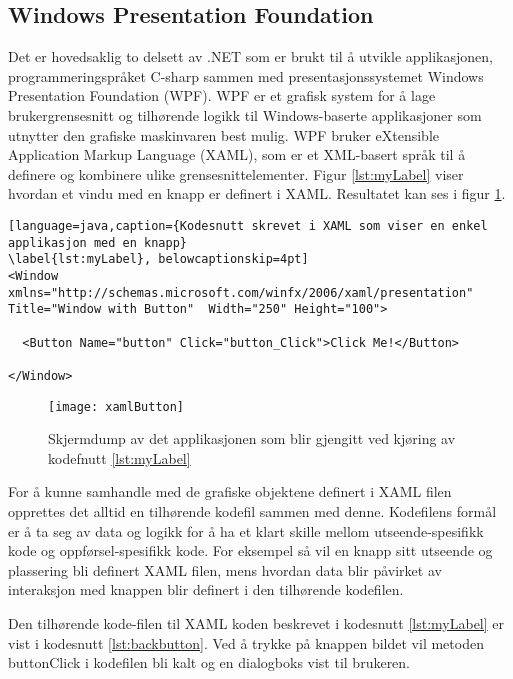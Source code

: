 \subsection{Windows Presentation Foundation}

Det er hovedsaklig to delsett av .NET som er brukt til å utvikle applikasjonen, programmeringspråket C-sharp sammen med presentasjonssystemet Windows Presentation Foundation (\gls{WPF}).  WPF er et grafisk system for å lage brukergrensesnitt og tilhørende logikk til Windows-baserte applikasjoner som utnytter den grafiske maskinvaren best mulig. WPF bruker eXtensible Application Markup Language (\gls{XAML}), som er et XML-basert språk til å definere og kombinere ulike grensesnittelementer. Figur \ref{lst:myLabel} viser hvordan et vindu med en knapp er definert i XAML. Resultatet kan ses i figur \ref{fig:xamlButton}. 

\begin{lstlisting}[language=java,caption={Kodesnutt skrevet i XAML som viser en enkel applikasjon med en knapp}
\label{lst:myLabel}, belowcaptionskip=4pt]
<Window xmlns="http://schemas.microsoft.com/winfx/2006/xaml/presentation" Title="Window with Button"  Width="250" Height="100">

  <Button Name="button" Click="button_Click">Click Me!</Button>
  
</Window>
\end{lstlisting}



\begin{figure}[ht!]
\centering
\texttt{[image: xamlButton]}
\caption{Skjermdump av det applikasjonen som blir gjengitt ved kjøring av kodefnutt \ref{lst:myLabel}}
\label{fig:xamlButton}
\end{figure}


For å kunne samhandle med de grafiske objektene definert i XAML filen opprettes det alltid en tilhørende kodefil sammen med denne. Kodefilens formål er å ta seg av data og logikk for å ha et klart skille mellom utseende-spesifikk kode og oppførsel-spesifikk kode. For eksempel så vil en knapp sitt utseende og plassering bli definert XAML filen, mens hvordan data blir påvirket av interaksjon med knappen blir definert i den tilhørende kodefilen.



Den tilhørende kode-filen til XAML koden beskrevet i kodesnutt \ref{lst:myLabel} er vist i kodesnutt \ref{lst:backbutton}. Ved å trykke på knappen bildet vil metoden button\textunderscore Click i kodefilen bli kalt og en dialogboks vist til brukeren.

